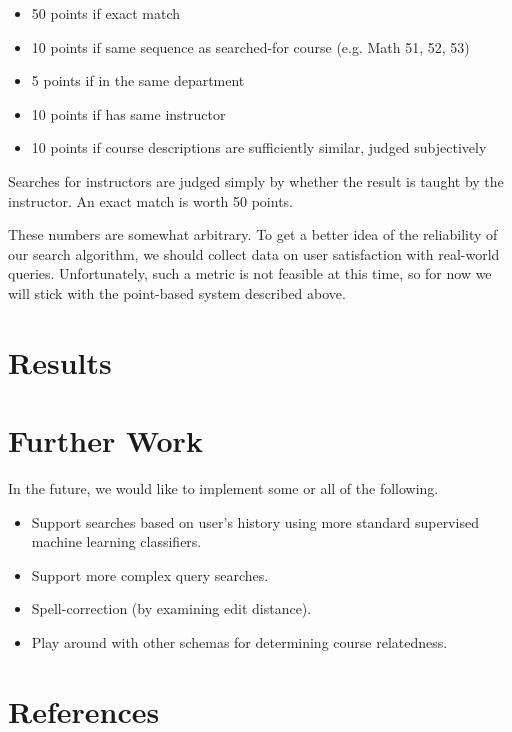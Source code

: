 \documentclass[12pt]{article}
\begin{document}
\begin{itemize}
\item 50 points if exact match
\item 10 points if same sequence as searched-for course (e.g. Math 51,
  52, 53)
\item 5 points if in the same department
\item 10 points if has same instructor
\item 10 points if course descriptions are sufficiently similar, judged subjectively  
\end{itemize}

Searches for instructors are judged simply by whether the result is
taught by the instructor. An exact match is worth 50 points.

These numbers are somewhat arbitrary. To get a better idea of the
reliability of our search algorithm, we should collect data on user
satisfaction with real-world queries. Unfortunately, such a metric is
not feasible at this time, so for now we will stick with the
point-based system described above.

\section*{Results}
	
\section*{Further Work}

In the future, we would like to implement some or all of the following.

\begin{itemize}
\item Support searches based on user's history using more standard supervised machine learning classifiers.
\item Support more complex query searches.
\item Spell-correction (by examining edit distance).
\item Play around with other schemas for determining course relatedness.
\end{itemize}

\section*{References}
\end{document}
